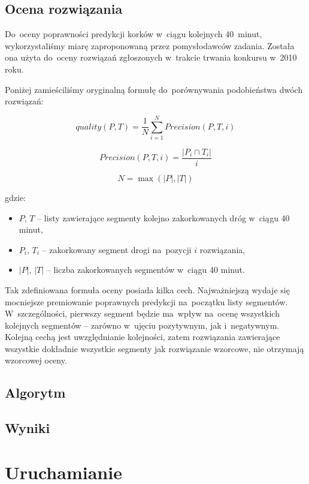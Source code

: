 \documentclass[a4paper,12pt]{mwart}
\begin{document}
\subsection{Ocena rozwiązania}

Do~oceny poprawności predykcji korków w~ciągu kolejnych 40~minut, wykorzystaliśmy miarę zaproponowaną przez pomysłodawców zadania. Została ona użyta do~oceny rozwiązań zgłoszonych w~trakcie trwania konkursu w~2010 roku.

Poniżej zamieściliśmy oryginalną formułę do~porównywania podobieństwa dwóch rozwiązań:

\[quality(P, T) = \frac{1}{N}\sum_{i = 1}^N Precision(P, T, i)\]

\[Precision(P, T, i) = \frac{\left | P_i \cap T_i \right |}{i}\]

\[N = \max (\left | P \right |, \left | T \right |)\]

gdzie:

\begin{itemize}
\item $P$, $T$ -- listy zawierające segmenty kolejno zakorkowanych dróg w~ciągu 40 minut,
\item $P_i$, $T_i$ -- zakorkowany segment drogi na~pozycji $i$ rozwiązania,
\item $\left | P \right |$, $\left | T \right |$ -- liczba zakorkowanych segmentów w~ciągu 40 minut.
\end{itemize}

Tak zdefiniowana formuła oceny posiada kilka cech. Najważniejszą wydaje się mocniejsze premiowanie poprawnych predykcji na~początku listy segmentów. W~szczególności, pierwszy segment będzie ma~wpływ na~ocenę wszystkich kolejnych segmentów -- zarówno w~ujęciu pozytywnym, jak i~negatywnym. Kolejną cechą jest uwzględnianie kolejności, zatem rozwiązania zawierające wszystkie dokładnie wszystkie segmenty jak rozwiązanie wzorcowe, nie otrzymają wzorcowej oceny.

\subsection{Algorytm}

\subsection{Wyniki}

\section{Uruchamianie}
\end{document}
